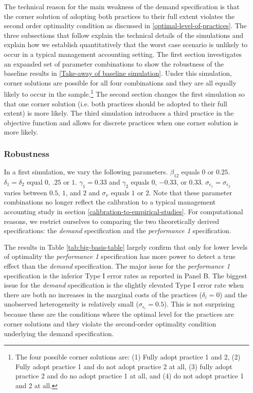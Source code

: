 \documentclass[12pt]{article}
\begin{document}
The technical reason for the main weakness of the demand specification is that the corner solution of adopting both practices to their full extent violates the second order optimality condition as discussed in \ref{optimal-level-of-practices}. The three subsections that follow explain the technical details of the simulations and explain how we establish quantitatively that the worst case scenario is unlikely to occur in a typical management accounting setting. The first section investigates an expanded set of parameter combinations to show the robustness of the baseline results in \ref{Take-away of baseline simulation}. Under this simulation, corner solutions are possible for all four combinations and they are all equally likely to occur in the sample.\footnote{The four possible corner solutions are: (1) Fully adopt practice 1 and 2, (2) Fully adopt practice 1 and do not adopt practice 2 at all, (3) fully adopt practice 2 and do no adopt practice 1 at all, and (4) do not adopt practice 1 and 2 at all.} The second section changes the first simulation so that one corner solution (i.e. both practices should be adopted to their full extent) is more likely. The third simulation introduces a third practice in the objective function and allows for discrete practices when one corner solution is more likely. 

\subsubsection{Robustness}

In a first simulation, we vary the following parameters. $\beta_{12}$ equals $0$ or $0.25$. $\delta_1 = \delta_2$ equal $0$, $.25$ or $1$. $\gamma_1 = 0.33$ and $\gamma_2$ equals $0$, $-0.33$, or $0.33$. $\sigma_{\epsilon_1} = \sigma_{\epsilon_2}$ varies between $0.5$, $1$, and $2$ and $\sigma_{\nu}$ equals $1$ or $2$. Note that these parameter combinations no longer reflect the calibration to a typical management accounting study in section \ref{calibration-to-empirical-studies}. For computational reasons, we restrict ourselves to comparing the two theoretically derived specifications: the \emph{demand} specification and the \emph{performance 1} specification.



The results in Table \ref{tab:big-basis-table} largely confirm that only for lower levels of optimality the \emph{performance 1} specification has more power to detect a true effect than the \emph{demand} specification. The major issue for the \emph{performance 1} specification is the inferior Type I error rates as reported in Panel B. The biggest issue for the \emph{demand} specification is the slightly elevated Type I error rate when there are both no increases in the marginal costs of the practices ($\delta_i = 0$) and the unobserved heterogeneity is relatively small ($\sigma_{\epsilon_i} = 0.5$). This is not surprising because these are the conditions where the optimal level for the practices are corner solutions and they violate the second-order optimality condition underlying the demand specification.
\end{document}
